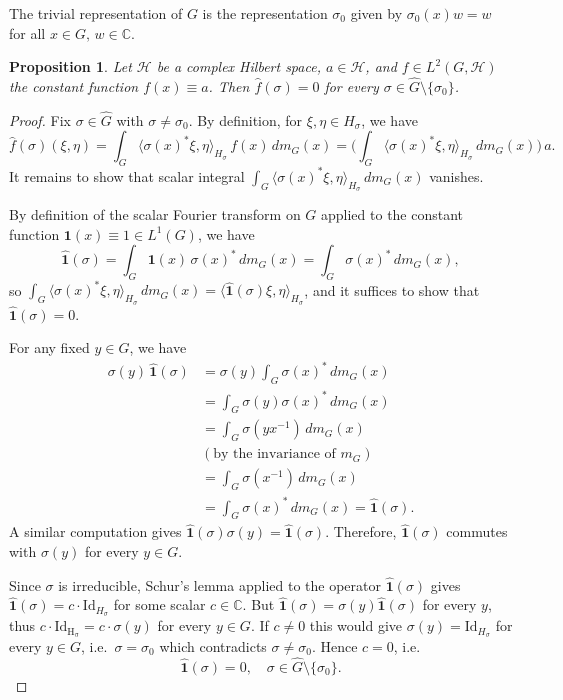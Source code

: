 \documentclass[11pt]{amsart}
\newtheorem{proposition}[theorem]{Proposition}
\begin{document}
The trivial representation of $G$ is the representation $\sigma_0$ given by  $\sigma_0(x)w=w$ for all $x\in G, \,w\in \mathbb C$. 


\begin{proposition}\label{Claim}
Let $\mathcal{H}$ be a complex Hilbert space,  $a\in \mathcal{H}$, and $f\in L^2(G,\mathcal{H})$ the constant function $f(x)\equiv a$. Then
$\widehat f(\sigma)=0$ for every $\sigma\in\widehat{G}\setminus\{\sigma_0\}$.
\end{proposition}

\begin{proof}
Fix  $\sigma\in\widehat{G}$ with $\sigma\ne\sigma_0$. By definition, for $\xi,\eta\in H_\sigma$,  we have
$$
\widehat f(\sigma)(\xi,\eta)=\int_G\langle\sigma(x)^*\xi,\eta\rangle_{H_\sigma}\,f(x)\,
dm_G(x)=\Big(\int_G\langle\sigma(x)^*\xi,\eta\rangle_{H_\sigma}\,dm_G(x)\Big)\,a.
$$
 It remains to show that scalar integral  $\displaystyle\int_G\langle\sigma(x)^*\xi,
\eta\rangle_{H_\sigma}\,dm_G(x)$ vanishes.

By definition of the scalar Fourier transform
on $G$ applied to the constant function $\mathbf 1(x)\equiv1\in L^1(G)$, we have 
$$
\widehat{\mathbf 1}(\sigma)=\int_G\mathbf 1(x)\,\sigma(x)^*\,dm_G(x)=\int_G\sigma(x)^*\,
dm_G(x),
$$
so $\displaystyle\int_G\langle\sigma(x)^*\xi,\eta\rangle_{H_\sigma}\,dm_G(x)=\langle\widehat{\mathbf1}(\sigma)
\xi,\eta\rangle_{H_\sigma}$, and it suffices to show that $\widehat{\mathbf 1}(\sigma)=0$.

 For any fixed
$y\in G$, we have
\begin{align*}
\sigma(y)\,\hat{\mathbf1}(\sigma)&=\sigma(y)\int_G\sigma(x)^*\,dm_G(x)\\
&=\int_G
\sigma(y)\sigma(x)^*\,dm_G(x)\\
&=\int_G\sigma(y x^{-1})\,dm_G(x)\\
&(\text{by the invariance of } m_G)\\
&=\int_G\sigma(x^{-1})\,dm_G(x)\\
&=\int_G\sigma(x)^*\,dm_G(x)=\widehat{\mathbf 1}(\sigma).
\end{align*}
A similar  computation  gives
$\widehat{\mathbf1}(\sigma)\sigma(y)=\hat{\mathbf1}(\sigma)$. Therefore, 
$\widehat{\mathbf1}(\sigma)$ commutes with $\sigma(y)$ for every $y\in G$. 

 Since $\sigma$ is irreducible, Schur's lemma applied
to the  operator $\widehat{\mathbf1}(\sigma)$  gives
$\widehat{\mathbf1}(\sigma)=c\cdot\mathrm{Id}_{H_\sigma}$ for some scalar $c\in\mathbb C$.
But $\hat{\mathbf 1}(\sigma)=\sigma(y)\hat{\mathbf1}(\sigma)$ for every $y$, thus 
 $c\cdot\mathrm{Id_{H_\sigma}}=c\cdot\sigma(y)$ for every $y\in G$.  If $c\ne0$ this would
give $\sigma(y)=\mathrm{Id}_{H_\sigma}$ for every $y\in G$, i.e.\ $\sigma=\sigma_0$
which contradicts $\sigma\ne\sigma_0$. Hence $c=0$, i.e.
$$
\widehat{\mathbf1}(\sigma)=0,\quad\sigma\in\widehat{G}\setminus\{\sigma_0\}.
$$

\end{proof}
\end{document}
